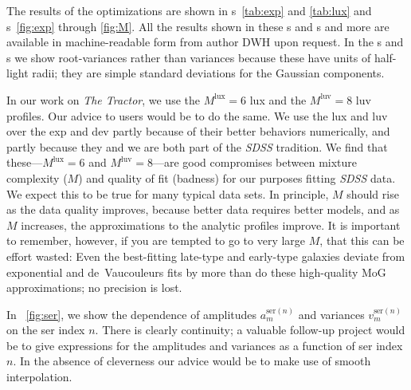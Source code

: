 \documentclass[12pt,pdftex,preprint]{aastex}
\newcommand{\project}[1]{\textsl{#1}}
\newcommand{\ser}{\mathrm{ser}}
\newcommand{\lux}{\mathrm{lux}}
\newcommand{\luv}{\mathrm{luv}}
\begin{document}
The results of the optimizations are shown in \tablename
s~\ref{tab:exp} and \ref{tab:lux} and \figurename s~\ref{fig:exp}
through \ref{fig:M}.  All the results shown in these \figurename s and
\tablename s and more are available in machine-readable form from author DWH
upon request.  In the \tablename s and \figurename s we show
root-variances rather than variances because these have units of
half-light radii; they are simple standard deviations for the Gaussian
components.

In our work on \project{The Tractor}, we use the $M^{\lux}=6$ lux and
the $M^{\luv}=8$ luv profiles.  Our advice to users would be to do the
same.  We use the lux and luv over the exp and dev partly because of
their better behaviors numerically, and partly because they and we are
both part of the \project{SDSS} tradition.  We find that
these---$M^{\lux}=6$ and $M^{\luv}=8$---are good compromises between
mixture complexity ($M$) and quality of fit (badness) for our purposes
fitting \project{SDSS} data.  We expect this to be true for many
typical data sets.  In principle, $M$ should rise as the data quality
improves, because better data requires better models, and as $M$
increases, the approximations to the analytic profiles improve.  It is
important to remember, however, if you are tempted to go to very large
$M$, that this can be effort wasted: Even the best-fitting late-type
and early-type galaxies deviate from exponential and de~Vaucouleurs
fits by more than do these high-quality MoG approximations; no
precision is lost.

In \figurename~\ref{fig:ser}, we show the dependence of amplitudes
$a^{\ser(n)}_m$ and variances $v^{\ser(n)}_m$ on the ser index $n$.
There is clearly continuity; a valuable follow-up project would be to
give expressions for the amplitudes and variances as a function of ser
index $n$.  In the absence of cleverness our advice would be to make
use of smooth interpolation.
\end{document}
